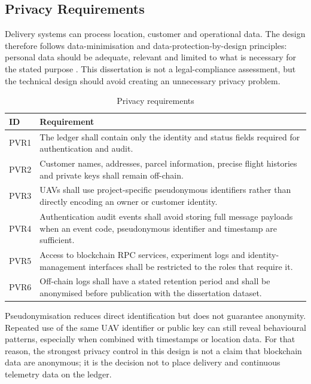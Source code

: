\subsection{Privacy Requirements}
\label{subsec:privacy-requirements}

Delivery systems can process location, customer and operational data. The design therefore follows data-minimisation and data-protection-by-design principles: personal data should be adequate, relevant and limited to what is necessary for the stated purpose \cite{GDPR2016}. This dissertation is not a legal-compliance assessment, but the technical design should avoid creating an unnecessary privacy problem.

\begin{table}[htbp]
    \centering
    \caption{Privacy requirements}
    \label{tab:privacy-requirements}
    \begin{tabular}{|p{}|p{}|}
        \hline
        \textbf{ID} & \textbf{Requirement} \\
        \hline
        PVR1 & The ledger shall contain only the identity and status fields required for authentication and audit. \\
        \hline
        PVR2 & Customer names, addresses, parcel information, precise flight histories and private keys shall remain off-chain. \\
        \hline
        PVR3 & UAVs shall use project-specific pseudonymous identifiers rather than directly encoding an owner or customer identity. \\
        \hline
        PVR4 & Authentication audit events shall avoid storing full message payloads when an event code, pseudonymous identifier and timestamp are sufficient. \\
        \hline
        PVR5 & Access to blockchain RPC services, experiment logs and identity-management interfaces shall be restricted to the roles that require it. \\
        \hline
        PVR6 & Off-chain logs shall have a stated retention period and shall be anonymised before publication with the dissertation dataset. \\
        \hline
    \end{tabular}
\end{table}

Pseudonymisation reduces direct identification but does not guarantee anonymity. Repeated use of the same UAV identifier or public key can still reveal behavioural patterns, especially when combined with timestamps or location data. For that reason, the strongest privacy control in this design is not a claim that blockchain data are anonymous; it is the decision not to place delivery and continuous telemetry data on the ledger.

